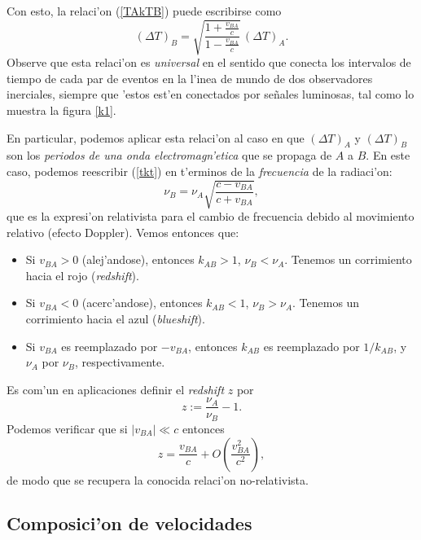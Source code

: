 Con esto, la relaci'on (\ref{TAkTB}) puede escribirse como
\begin{equation}
(\Delta T)_B=\sqrt{\frac{1+\frac{v_{BA}}{c}}{1-\frac{v_{BA}}{c}}}
\,(\Delta T)_A. \label{k2}
\end{equation}
Observe que esta relaci'on es \textit{universal} en el sentido que conecta los intervalos de tiempo de cada par de eventos en la l'inea de mundo de dos observadores inerciales, siempre que 'estos est'en conectados por se\~nales luminosas, tal como lo muestra la figura \ref{k1}.

En particular, podemos aplicar esta relaci'on al caso en que $(\Delta T)_A$ y
$(\Delta T)_B$ son los \textit{periodos de una onda electromagn'etica} que se propaga de $A$ a $B$. En este caso, podemos reescribir (\ref{tkt}) en t'erminos de la \textit{frecuencia} de la radiaci'on:
\begin{equation}
\nu_B=\nu_A\sqrt{\frac{c-v_{BA}}{c+v_{BA}}},
\end{equation}
que es la expresi'on relativista para el cambio de frecuencia debido al movimiento relativo (efecto Doppler). Vemos entonces que:
\begin{itemize}
\item Si $v_{BA}>0$ (alej'andose), entonces $k_{AB}>1$, $\nu_B <
\nu_A$.
Tenemos un corrimiento hacia el rojo (\textit{redshift}).
\item Si $v_{BA}<0$ (acerc'andose), entonces $k_{AB}<1$, $\nu_B >
\nu_A$.
Tenemos un corrimiento hacia el azul (\textit{blueshift}).
\item Si $v_{BA}$ es reemplazado por $-v_{BA}$, entonces $k_{AB}$ es reemplazado
por $1/{k_{AB}}$, y $\nu_A$ por $\nu_B$, respectivamente.
\end{itemize}
Es com'un en aplicaciones definir el \textit{redshift} $z$ por
\begin{equation}
z:=\frac{\nu_A}{\nu_B}-1.
\end{equation}
Podemos verificar que si $|v_{BA}|\ll c$ entonces 
\begin{equation}
z=\frac{v_{BA}}{c}+O(\frac{v_{BA}^2}{c^2}),
\end{equation}
de modo que se recupera la conocida relaci'on no-relativista.

\subsection{Composici'on de velocidades}

